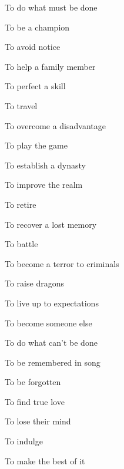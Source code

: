  
\item To do what must be done

 
\item To be a champion

 
\item To avoid notice

 
\item To help a family member

 
\item To perfect a skill

 
\item To travel

 
\item To overcome a disadvantage

 
\item To play the game

 
\item To establish a dynasty

 
\item To improve the realm

 
\item To retire

 
\item To recover a lost memory

 
\item To battle

 
\item To become a terror to criminals

 
\item To raise dragons

 
\item To live up to expectations

 
\item To become someone else

 
\item To do what can't be done

 
\item To be remembered in song

 
\item To be forgotten

 
\item To find true love

 
\item To lose their mind

 
\item To indulge

 
\item To make the best of it

